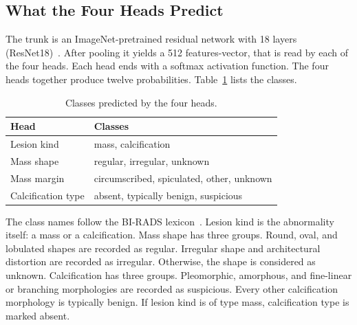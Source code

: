\subsection{What the Four Heads Predict}
\label{sec:concepts}

The trunk is an ImageNet-pretrained residual network with 18 layers (ResNet18)~\cite{he2016resnet}. After pooling it yields a 512 features-vector, that is read by each of the four heads. Each head ends with a softmax activation function. The four heads together produce twelve probabilities. Table~\ref{tab:heads} lists the classes.

\begin{table}[!t]
\caption{Classes predicted by the four heads.}
\label{tab:heads}
\centering
\footnotesize
\begin{tabular}{@{}l p{3.55cm}@{}}
\toprule
Head & Classes \\
\midrule
Lesion kind & mass, calcification \\
Mass shape & regular, irregular, unknown \\
Mass margin & circumscribed, spiculated, other, unknown \\
Calcification type & absent, typically benign, suspicious \\
\bottomrule
\end{tabular}
\end{table}

The class names follow the BI-RADS lexicon~\cite{acr2013birads,lee2017cbis}. Lesion kind is the abnormality itself: a mass or a calcification. Mass shape has three groups. Round, oval, and lobulated shapes are recorded as regular. Irregular shape and architectural distortion are recorded as irregular. Otherwise, the shape is considered as unknown.  Calcification has three groups. Pleomorphic, amorphous, and fine-linear or branching morphologies are recorded as suspicious. Every other calcification morphology is typically benign. If lesion kind is of type mass, calcification type is marked absent.

